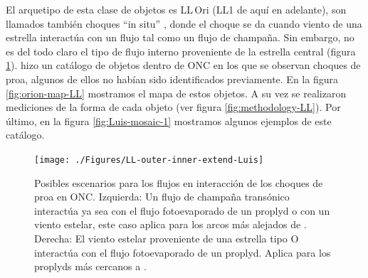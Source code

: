 El arquetipo de esta clase de objetos es LL\,Ori (LL1 de aquí en adelante), son llamados también choques ``in situ'' \citep{Kobulnicky:2016}, donde el choque se da cuando viento de una estrella interactúa con un flujo tal como un flujo de champaña. Sin embargo, no es del todo claro el tipo de flujo interno proveniente de la estrella central (figura \ref{fig:LL-scheme}). \citet{Gutierrez-Soto:2015a} hizo un catálogo de objetos dentro de ONC en los que se observan choques de proa, algunos de ellos no habían sido identificados previamente. En la figura \ref{fig:orion-map-LL} mostramos el mapa de estos objetos. A su vez se realizaron mediciones de la forma de cada objeto (ver figura \ref{fig:methodology-LL}). Por último, en la figura \ref{fig:Luis-mosaic-1} mostramos algunos ejemplos de este catálogo.

\begin{figure}
  \centering
  \texttt{[image: ./Figures/LL-outer-inner-extend-Luis]}
  \caption[Posibles escenarios para los flujos en interacción de los choques de proa en ONC]{Posibles escenarios para los flujos en interacción de los choques de proa en ONC. Izquierda: Un flujo de champaña transónico interactúa ya sea con el flujo fotoevaporado de un proplyd o con un viento estelar, este caso aplica para los arcos más alejados de \thC{}. Derecha: El viento estelar proveniente de una estrella tipo O interactúa con el flujo fotoevaporado de un proplyd. Aplica para los proplyds más cercanos a \thC{}.}
  \label{fig:LL-scheme}
\end{figure}

